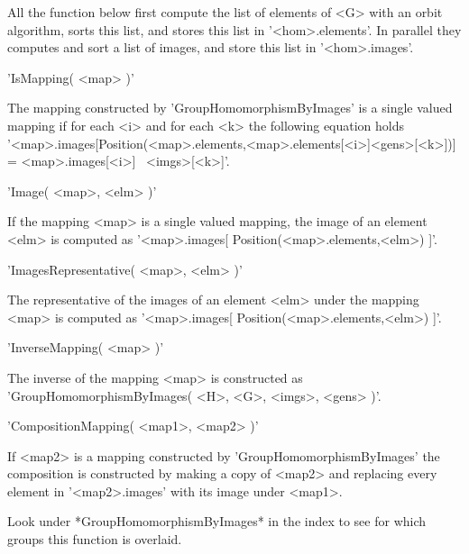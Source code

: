 All the function below first compute the list of elements  of <G> with an
orbit   algorithm,   sorts   this  list,   and   stores   this   list  in
'<hom>.elements'.  In  parallel they computes and  sort a list of images,
and store this list in '<hom>.images'.

\vspace{5mm}
'IsMapping( <map> )'%

The mapping constructed by 'GroupHomomorphismByImages' is a single valued
mapping if for each  <i>  and for each  <k> the following equation  holds \\
'<map>.images[Position(<map>.elements,<map>.elements[<i>]\*<gens>[<k>])]  \\
= <map>.images[<i>] \*\ <imgs>[<k>]'.

\vspace{5mm}
'Image( <map>, <elm> )'%

If the mapping <map> is a single valued mapping, the image of  an element
<elm> is computed as '<map>.images[ Position(<map>.elements,<elm>) ]'.

\vspace{5mm}
'ImagesRepresentative( <map>, <elm> )'%

The representative of the  images of  an  element <elm> under the mapping
<map> is computed as '<map>.images[ Position(<map>.elements,<elm>) ]'.

\vspace{5mm}
'InverseMapping( <map> )'%

The    inverse    of    the    mapping   <map>    is    constructed    as
'GroupHomomorphismByImages( <H>, <G>, <imgs>, <gens> )'.

\vspace{5mm}
'CompositionMapping( <map1>, <map2> )'%

If <map2> is  a  mapping  constructed by 'GroupHomomorphismByImages'  the
composition is constructed by making a copy of <map2> and replacing every
element in '<map2>.images' with its image under <map1>.

Look  under *GroupHomomorphismByImages* in  the index  to  see  for which
groups this function is overlaid.


